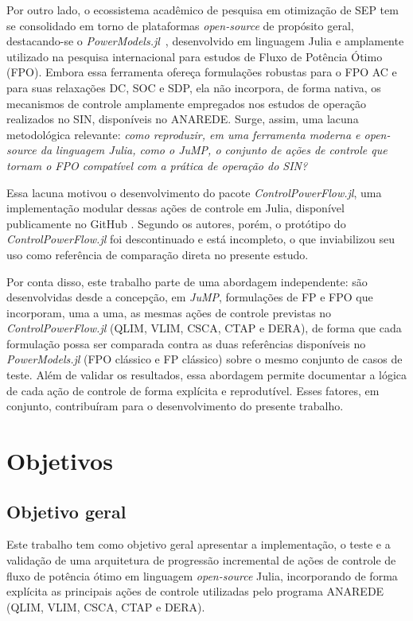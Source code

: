 Por outro lado, o ecossistema acadêmico de pesquisa em otimização de SEP tem se consolidado em torno de plataformas \textit{open-source} de propósito geral, destacando-se o \textit{PowerModels.jl}~\cite{coffrin2018powermodels}, desenvolvido em linguagem Julia e amplamente utilizado na pesquisa internacional para estudos de Fluxo de Potência Ótimo (FPO). Embora essa ferramenta ofereça formulações robustas para o FPO AC e para suas relaxações DC, SOC e SDP, ela não incorpora, de forma nativa, os mecanismos de controle amplamente empregados nos estudos de operação realizados no SIN, disponíveis no ANAREDE. Surge, assim, uma lacuna metodológica relevante: \emph{como reproduzir, em uma ferramenta moderna e \textit{open-source} da linguagem Julia, como o JuMP, o conjunto de ações de controle que tornam o FPO compatível com a prática de operação do SIN?}

Essa lacuna motivou o desenvolvimento do pacote \textit{ControlPowerFlow.jl}, uma implementação modular dessas ações de controle em Julia, disponível publicamente no GitHub \cite{chavarry2024}. Segundo os autores, porém, o protótipo do \textit{ControlPowerFlow.jl} foi descontinuado e está incompleto, o que inviabilizou seu uso como referência de comparação direta no presente estudo.

Por conta disso, este trabalho parte de uma abordagem independente: são desenvolvidas desde a concepção, em \textit{JuMP}, formulações de FP e FPO que incorporam, uma a uma, as mesmas ações de controle previstas no \textit{ControlPowerFlow.jl} (QLIM, VLIM, CSCA, CTAP e DERA), de forma que cada formulação possa ser comparada contra as duas referências disponíveis no \textit{PowerModels.jl} (FPO clássico e FP clássico) sobre o mesmo conjunto de casos de teste. Além de validar os resultados, essa abordagem permite documentar a lógica de cada ação de controle de forma explícita e reprodutível. Esses fatores, em conjunto, contribuíram para o desenvolvimento do presente trabalho.

\section{Objetivos}
\label{sec:objetivos}

\subsection{Objetivo geral}
\label{subsec:obj-geral}

Este trabalho tem como objetivo geral apresentar a implementação, o teste e a validação de uma arquitetura de progressão incremental de ações de controle de fluxo de potência ótimo em linguagem \textit{open-source} Julia, incorporando de forma explícita as principais ações de controle utilizadas pelo programa ANAREDE (QLIM, VLIM, CSCA, CTAP e DERA).

